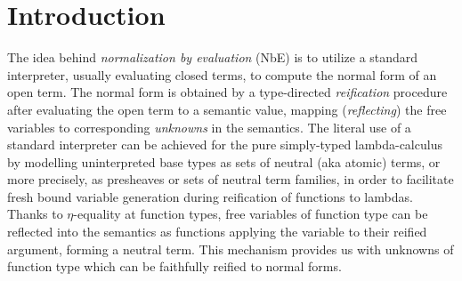 \documentclass[sigplan,screen]{acmart}
\begin{document}



\maketitle


\section{Introduction}
\label{sec:intro}

The idea behind \emph{normalization by evaluation} (NbE) is to utilize a
standard interpreter, usually evaluating closed terms, to compute the
normal form of an open term.
The normal form is obtained by a type-directed \emph{reification}
procedure after evaluating the open term to a semantic value, mapping
(\emph{reflecting})
the free variables to corresponding \emph{unknowns} in the semantics.
The literal use of a standard interpreter
can be achieved for the pure simply-typed lambda-calculus
\cite{bergerSchwichtenberg:lics91,filinski:semaccounttdpe}
by modelling uninterpreted base types as sets of neutral (aka atomic)
terms, or more precisely, as presheaves or sets of neutral term
families, in order to facilitate fresh bound variable generation during
reification of functions to lambdas.
Thanks to $\eta$-equality at function types, free variables of
function type can be reflected into the semantics as functions
applying the variable to their reified argument,
forming a neutral term.  This mechanism provides us with unknowns of
function type which can be faithfully reified to normal forms.
\end{document}
